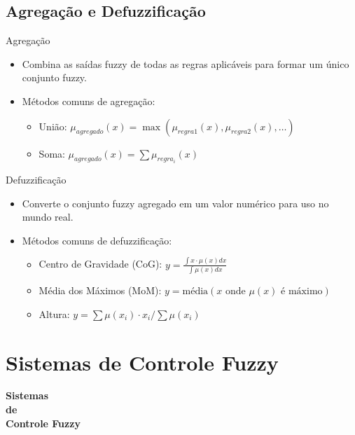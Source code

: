 \documentclass{beamer}
\begin{document}
\subsection{Agregação e Defuzzificação}
\footnotesize
\begin{frame}{}
    \begin{block}{Agregação}
        \begin{itemize}
            \item Combina as saídas fuzzy de todas as regras aplicáveis para formar um único conjunto fuzzy.
            \item Métodos comuns de agregação:
            \begin{itemize}
                \item União: \( \mu_{agregado}(x) = \max(\mu_{regra1}(x), \mu_{regra2}(x), \ldots) \)
                \item Soma: \( \mu_{agregado}(x) = \sum \mu_{regra_i}(x) \)
            \end{itemize}
        \end{itemize}
    \end{block}
    \pause
    \begin{block}{Defuzzificação}
        \begin{itemize}
            \item Converte o conjunto fuzzy agregado em um valor numérico para uso no mundo real.
            \item Métodos comuns de defuzzificação:
            \begin{itemize}
                \item Centro de Gravidade (CoG): \( y = \frac{\int x \cdot \mu(x) dx}{\int \mu(x) dx} \)
                \item Média dos Máximos (MoM): \( y = \text{média}(x \text{ onde } \mu(x) \text{ é máximo}) \)
                \item Altura: \( y = \sum \mu(x_i) \cdot x_i / \sum \mu(x_i) \)
            \end{itemize}
        \end{itemize}
    \end{block}
\end{frame}
\section{Sistemas de Controle Fuzzy}
\begin{frame}
\centering
\Huge
\textbf{Sistemas\\de\\Controle Fuzzy}
\end{frame}
\end{document}
